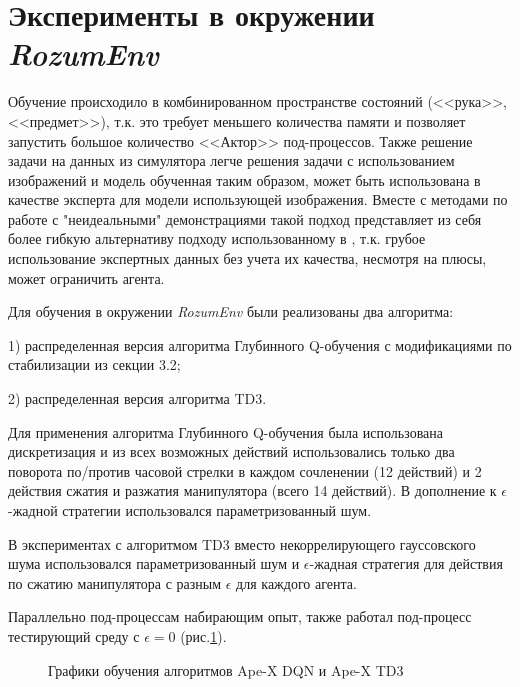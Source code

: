 \documentclass{mipt-thesis-bs}
\begin{document}
\section{Эксперименты в окружении \textit{RozumEnv}}
Обучение происходило в комбинированном пространстве состояний (<<рука>>, <<предмет>>), т.к. это требует меньшего количества памяти и позволяет запустить большое количество <<Актор>> под-процессов.
Также решение задачи на данных из симулятора легче решения задачи с использованием изображений и модель обученная таким образом, может быть использована в качестве эксперта для модели использующей изображения.
Вместе с методами по работе с "неидеальными" демонстрациями такой подход представляет из себя более гибкую альтернативу подходу использованному в \cite{aytar}, т.к. грубое использование экспертных данных без учета их качества, несмотря на плюсы, может ограничить агента.  

Для обучения в окружении \textit{RozumEnv} были реализованы два алгоритма:

1) распределенная версия алгоритма Глубинного Q-обучения с модификациями по стабилизации из секции 3.2;

2) распределенная версия алгоритма TD3. 

Для применения алгоритма Глубинного Q-обучения была использована дискретизация и из всех возможных действий использовались только два поворота по/против часовой стрелки в каждом сочленении (12 действий) и 2 действия сжатия и разжатия манипулятора (всего 14 действий). В дополнение к $\epsilon$-жадной стратегии использовался параметризованный шум.   

В экспериментах с алгоритмом TD3 вместо некоррелирующего гауссовского шума использовался параметризованный шум и $\epsilon$-жадная стратегия для действия по сжатию манипулятора с разным $\epsilon$ для каждого агента.

Параллельно под-процессам набирающим опыт, также работал под-процесс тестирующий среду с $\epsilon=0$ (рис.\ref{dqntd3}).

\begin{figure}[ht]
    \centering
    \hspace{0.02\linewidth}
    \vspace{-0.2cm}
    \caption{Графики обучения алгоритмов Ape-X DQN и Ape-X TD3}
    \label{dqntd3}
\end{figure}
\end{document}
